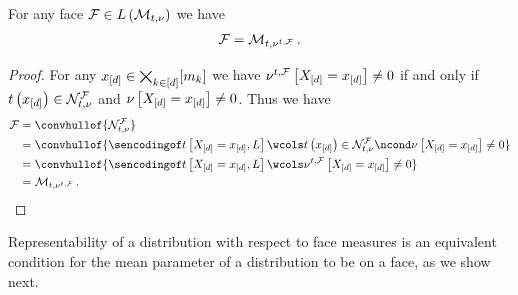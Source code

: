 \begin{lemma}
    \label{lem:faceAsRefinedPolytope}
    For any face $\mathcal{F}\in L\left(\mathcal{M}_{t,\nu}\right)$ we have
    \begin{align*}
        \mathcal{F} = \mathcal{M}_{t,\nu^{t,\mathcal{F}}} \, .
    \end{align*}
\end{lemma}
\begin{proof}
    For any $x_{[d]}\in\bigtimes_{k\in[d]}[m_{k}]$ we have $\nu^{t,\mathcal{F}}\left[X_{[d]}=x_{[d]}\right]\neq0$ if and only if $t\left(x_{[d]}\right)\in\mathcal{N}_{t,\nu}^{\mathcal{F}}$ and $\nu\left[X_{[d]}=x_{[d]}\right]\neq0$.
    Thus we have
    \begin{align*}
        \facesymbol
        &= \convhullof{\genfaceimset} \\
        &= \convhullof{\sencsstatat{\indexedshortcatvariables,\selvariable} \wcols \sstatat{\shortcatindices}\in\genfaceimset\ncond \basemeasureat{\indexedshortcatvariables}\neq 0} \\
        &= \convhullof{\sencsstatat{\indexedshortcatvariables,\selvariable} \wcols \genfacemeasureat{\indexedshortcatvariables}\neq 0} \\
        &= \meansetof{\sstat,\basemeasureof{\sstat,\facesymbol}} \, . \qedhere
    \end{align*}
\end{proof}

Representability of a distribution with respect to face measures is an equivalent condition for the mean parameter of a distribution to be on a face, as we show next.

